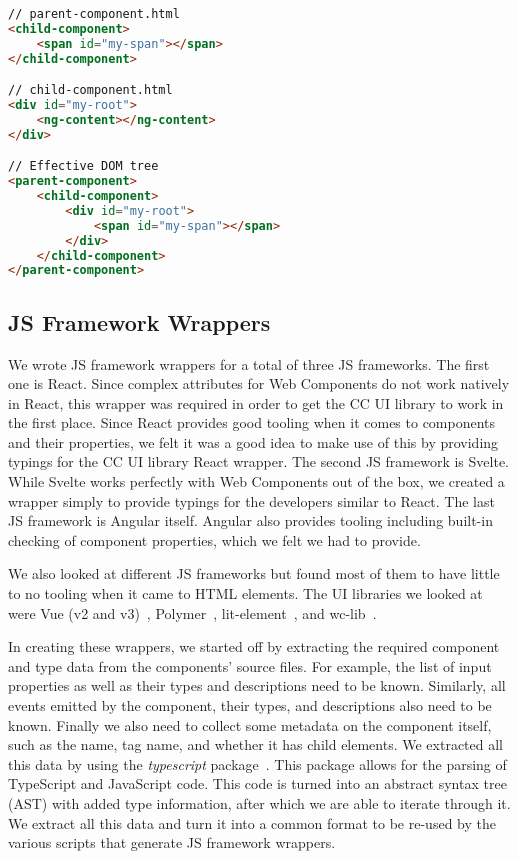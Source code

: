 \begin{lstlisting}[language={HTML},caption={HTML source code and its Angular Elements equivalent},label={lst:case-study:ng-content}]
// parent-component.html
<child-component>
	<span id="my-span"></span>
</child-component>

// child-component.html
<div id="my-root">
	<ng-content></ng-content>
</div>

// Effective DOM tree
<parent-component>
	<child-component>
		<div id="my-root">
			<span id="my-span"></span>
		</div>
	</child-component>
</parent-component>
	\end{lstlisting}

\subsection{JS Framework Wrappers}
We wrote JS framework wrappers for a total of three JS frameworks. The first one is React. Since complex attributes for Web Components do not work natively in React, this wrapper was required in order to get the CC UI library to work in the first place. Since React provides good tooling when it comes to components and their properties, we felt it was a good idea to make use of this by providing typings for the CC UI library React wrapper. The second JS framework is Svelte. While Svelte works perfectly with Web Components out of the box, we created a wrapper simply to provide typings for the developers similar to React. The last JS framework is Angular itself. Angular also provides tooling including built-in checking of component properties, which we felt we had to provide.

We also looked at different JS frameworks but found most of them to have little to no tooling when it came to HTML elements. The UI libraries we looked at were Vue (v2 and v3)~, Polymer~, lit-element~, and wc-lib~.

In creating these wrappers, we started off by extracting the required component and type data from the components' source files. For example, the list of input properties as well as their types and descriptions need to be known. Similarly, all events emitted by the component, their types, and descriptions also need to be known. Finally we also need to collect some metadata on the component itself, such as the name, tag name, and whether it has child elements. We extracted all this data by using the \emph{typescript} package~. This package allows for the parsing of TypeScript and JavaScript code. This code is turned into an abstract syntax tree (AST) with added type information, after which we are able to iterate through it. We extract all this data and turn it into a common format to be re-used by the various scripts that generate JS framework wrappers.

